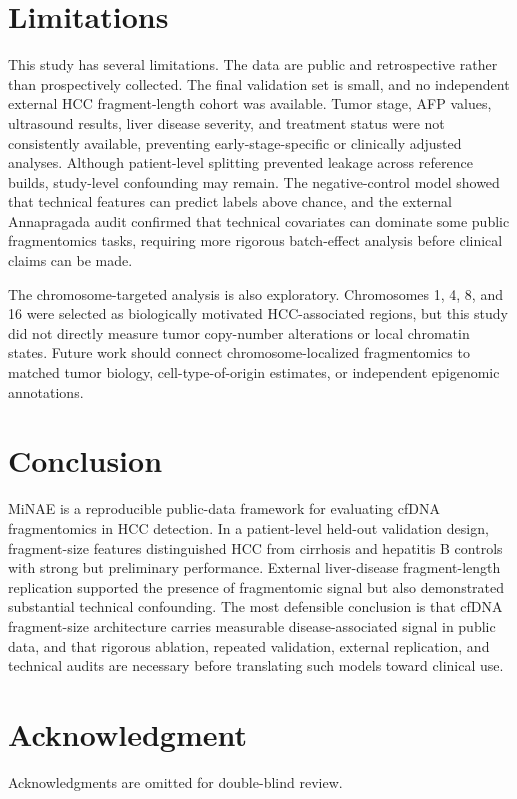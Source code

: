 \documentclass[conference]{IEEEtran}
\begin{document}
\section{Limitations}
This study has several limitations. The data are public and retrospective rather than prospectively collected. The final validation set is small, and no independent external HCC fragment-length cohort was available. Tumor stage, AFP values, ultrasound results, liver disease severity, and treatment status were not consistently available, preventing early-stage-specific or clinically adjusted analyses. Although patient-level splitting prevented leakage across reference builds, study-level confounding may remain. The negative-control model showed that technical features can predict labels above chance, and the external Annapragada audit confirmed that technical covariates can dominate some public fragmentomics tasks, requiring more rigorous batch-effect analysis before clinical claims can be made.

The chromosome-targeted analysis is also exploratory. Chromosomes 1, 4, 8, and 16 were selected as biologically motivated HCC-associated regions, but this study did not directly measure tumor copy-number alterations or local chromatin states. Future work should connect chromosome-localized fragmentomics to matched tumor biology, cell-type-of-origin estimates, or independent epigenomic annotations.

\section{Conclusion}
MiNAE is a reproducible public-data framework for evaluating cfDNA fragmentomics in HCC detection. In a patient-level held-out validation design, fragment-size features distinguished HCC from cirrhosis and hepatitis B controls with strong but preliminary performance. External liver-disease fragment-length replication supported the presence of fragmentomic signal but also demonstrated substantial technical confounding. The most defensible conclusion is that cfDNA fragment-size architecture carries measurable disease-associated signal in public data, and that rigorous ablation, repeated validation, external replication, and technical audits are necessary before translating such models toward clinical use.

\section*{Acknowledgment}
Acknowledgments are omitted for double-blind review.



\end{document}
